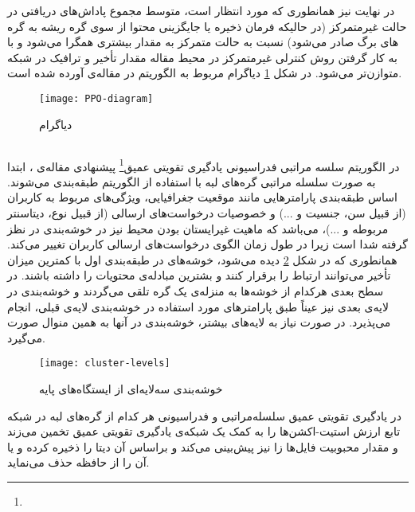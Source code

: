 در نهایت نیز همانطوری که مورد انتظار است، متوسط مجموع پاداش‌های دریافتی در حالت غیرمتمرکز (در حالیکه فرمان ذخیره یا جایگزینی محتوا از سوی گره ریشه به گره های برگ صادر می‌شود) نسبت به حالت متمرکز به مقدار بیشتری همگرا می‌شود و با به کار گرفتن روش کنترلی غیرمتمرکز در محیط مقاله مقدار تأخیر و ترافیک در شبکه متوازن‌تر می‌شود.
\pagebreak
در شکل \ref{fig:ppod} دیاگرام مربوط به الگوریتم  در مقاله‌ی \cite{wu2022deep} آورده شده است.

\begin{figure}[ht]
	\centerline{\texttt{[image: PPO-diagram]}}
	\caption{دیاگرام }
	\label{fig:ppod}
\end{figure}

\newpage
\subsection{}

در الگوریتم سلسه مراتبی فدراسیونی یادگیری تقویتی عمیق\footnote{} پیشنهادی مقاله‌ی \cite{majidi2021hfdrl}، ابتدا به صورت سلسله مراتبی گره‌های لبه با استفاده از الگوریتم  طبقه‌بندی می‌شوند. اساس طبقه‌بندی پارامترهایی مانند موقعیت جغرافیایی، ویژگی‌های مربوط به کاربران (از قبیل سن، جنسیت و ...) و خصوصیات درخواست‌های ارسالی (از قبیل نوع،‌ دیتاسنتر مربوطه و ...)، می‌باشد که ماهیت غیرایستان بودن محیط نیز در خوشه‌بندی در نظز گرفته شدا است زیرا در طول زمان الگوی درخواست‌های ارسالی کاربران تغییر می‌کند. همانطوری که در شکل \ref{fig:cluster-levels} دیده می‌شود، خوشه‌های در طبقه‌بندی اول  با کمترین میزان تأخیر می‌توانند ارتباط را برقرار کنند و بشترین مبادله‌ی محتویات را داشته باشند. در سطح بعدی هرکدام از خوشه‌ها به منزله‌ی یک گره تلقی می‌گردند و خوشه‌بندی در لایه‌ی بعدی نیز عیناً طبق پارامترهای مورد استفاده در خوشه‌بندی لایه‌ی قبلی، انجام می‌پذیرد. در صورت نیاز به لایه‌های بیشتر، خوشه‌بندی در آنها به همین منوال صورت می‌گیرد. 

\begin{figure}[ht]
	\centerline{\texttt{[image: cluster-levels]}}
	\caption{خوشه‌بندی سه‌لایه‌ای از ایستگاه‌های پایه}
	\label{fig:cluster-levels}
\end{figure}

در یادگیری تقویتی عمیق سلسله‌مراتبی و فدراسیونی هر کدام از گره‌های لبه در شبکه تابع ارزش استیت-اکشن‌ها را به کمک یک شبکه‌ی یادگیری تقویتی عمیق تخمین می‌زند و مقدار محبوبیت فایل‌ها زا نیز پیش‌بینی می‌کند و براساس آن دیتا را ذخیره کرده و یا آن را از حافظه حذف می‌نماید.  

